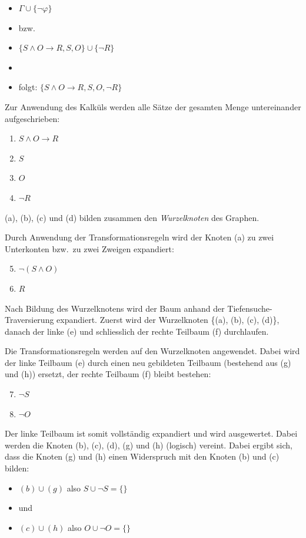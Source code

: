 \begin{itemize}
    \item $\Gamma \cup \{\neg\varphi\}$
    \item[] bzw.
    \item $\{S \wedge O \rightarrow R, S, O\} \cup \{\neg R\}$
    \item[]
    \item[] folgt: $\{S \wedge O \rightarrow R, S, O, \neg R\}$
\end{itemize}

Zur Anwendung des Kalküls werden alle Sätze der gesamten Menge untereinander aufgeschrieben:
\begin{enumerate}[label= (\alph*)]
    \item $ S \wedge O \rightarrow R $
    \item $S$
    \item $O$
    \item $\neg R$
\end{enumerate}

(a), (b), (c) und (d) bilden zusammen den \textit{Wurzelknoten} des Graphen.

Durch Anwendung der Transformationsregeln wird der Knoten (a) zu zwei Unterkonten bzw.\ zu zwei Zweigen expandiert:
\begin{enumerate}[label= (\alph*)]
    \setcounter{enumi}{4}
    \item $ \neg(S \wedge O) $
    \item $R$
\end{enumerate}

Nach Bildung des Wurzelknotens wird der Baum anhand der Tiefensuche-Traversierung expandiert. Zuerst wird der Wurzelknoten \{(a), (b), (c), (d)\}, danach der linke (e) und schliesslich der rechte Teilbaum (f) durchlaufen.

Die Transformationsregeln werden auf den Wurzelknoten angewendet. Dabei wird der linke Teilbaum (e) durch einen neu gebildeten Teilbaum (bestehend aus (g) und (h)) ersetzt, der rechte Teilbaum (f) bleibt bestehen:
\begin{enumerate}[label= (\alph*)]
    \setcounter{enumi}{6}
    \item $\neg S$
    \item $\neg O$
\end{enumerate}

Der linke Teilbaum ist somit vollständig expandiert und wird ausgewertet. Dabei werden die Knoten (b), (c), (d), (g) und (h) (logisch) vereint. Dabei ergibt sich,  dass die Knoten (g) und (h) einen Widerspruch mit den Knoten (b) und (c) bilden:
\begin{itemize}
    \item $(b) \cup (g)$ also $S \cup \neg S = \{\}$
    \item[] und
    \item $(c) \cup (h)$ also $O \cup \neg O = \{\}$
\end{itemize}


